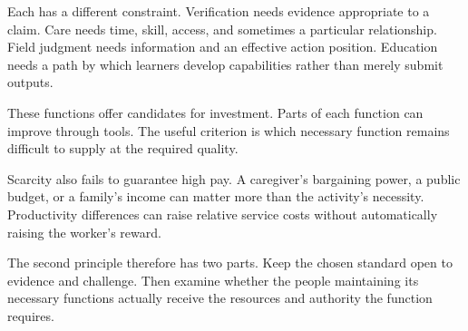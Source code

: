 Each has a different constraint. Verification needs evidence appropriate to a claim. Care needs time, skill, access, and sometimes a particular relationship. Field judgment needs information and an effective action position. Education needs a path by which learners develop capabilities rather than merely submit outputs.

These functions offer candidates for investment. Parts of each function can improve through tools. The useful criterion is which necessary function remains difficult to supply at the required quality.

Scarcity also fails to guarantee high pay. A caregiver's bargaining power, a public budget, or a family's income can matter more than the activity's necessity. Productivity differences can raise relative service costs without automatically raising the worker's reward.

The second principle therefore has two parts. Keep the chosen standard open to evidence and challenge. Then examine whether the people maintaining its necessary functions actually receive the resources and authority the function requires.
